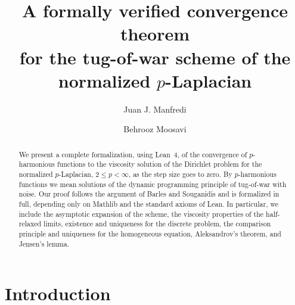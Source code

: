 \documentclass[11pt,reqno]{amsart}
\theoremstyle{plain}
\theoremstyle{definition}
\theoremstyle{remark}
\begin{document}
\title[A formally verified convergence theorem for the tug-of-war scheme]
      {A formally verified convergence theorem\\
       for the tug-of-war scheme of the normalized $p$-Laplacian}

\author{Juan J. Manfredi}
\address{Department of Mathematics, University of Pittsburgh,
  Pittsburgh, PA 15260, USA}

\author{Behrooz Moosavi}
\address{Department of Mathematics, University of Pittsburgh,
  Pittsburgh, PA 15260, USA}


\begin{abstract}
We present a complete formalization, using Lean~4, of the convergence of
$p$-harmonious functions to the viscosity solution of the Dirichlet problem
for the normalized $p$-Laplacian, $2 \le p < \infty$, as the step size goes to
zero. By $p$-harmonious functions we mean solutions of the dynamic programming
principle of tug-of-war with noise. Our proof follows the argument of Barles
and Souganidis and is formalized in full, depending only on Mathlib and the
standard axioms of Lean. In particular, we include the asymptotic expansion of
the scheme, the viscosity properties of the half-relaxed limits, existence and
uniqueness for the discrete problem, the comparison principle and uniqueness for the
homogeneous equation,
Aleksandrov's theorem, and Jensen's lemma.
\end{abstract}

\maketitle

\section{Introduction}\label{sec:intro}
\end{document}

